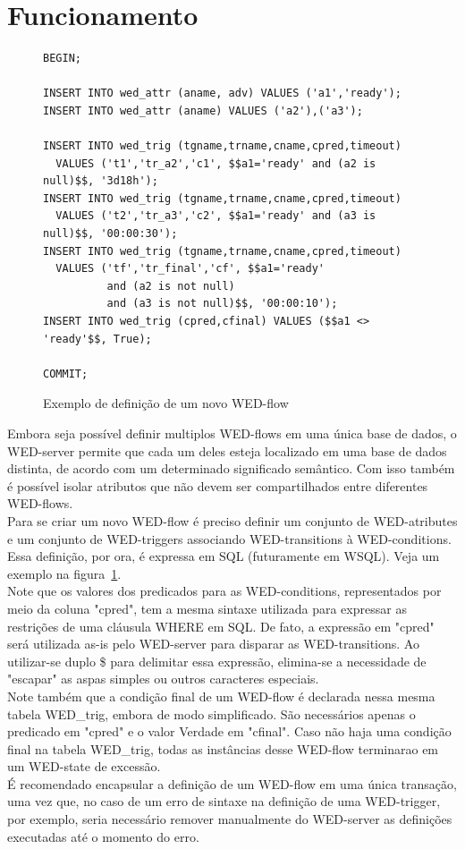 \documentclass[conference]{IEEEtran}
\begin{document}
\section{Funcionamento}
\begin{figure}[!t]
\begin{Verbatim}[fontsize=\tiny]
BEGIN;

INSERT INTO wed_attr (aname, adv) VALUES ('a1','ready');
INSERT INTO wed_attr (aname) VALUES ('a2'),('a3');

INSERT INTO wed_trig (tgname,trname,cname,cpred,timeout) 
  VALUES ('t1','tr_a2','c1', $$a1='ready' and (a2 is null)$$, '3d18h');
INSERT INTO wed_trig (tgname,trname,cname,cpred,timeout) 
  VALUES ('t2','tr_a3','c2', $$a1='ready' and (a3 is null)$$, '00:00:30');
INSERT INTO wed_trig (tgname,trname,cname,cpred,timeout) 
  VALUES ('tf','tr_final','cf', $$a1='ready' 
          and (a2 is not null) 
          and (a3 is not null)$$, '00:00:10');
INSERT INTO wed_trig (cpred,cfinal) VALUES ($$a1 <> 'ready'$$, True);

COMMIT;
\end{Verbatim}
\caption{Exemplo de definição de um novo WED-flow}
\label{fig_wf}
\end{figure}
 Embora seja possível definir multiplos WED-flows em uma única base de dados, o WED-server permite que cada um deles 
esteja localizado em uma base de dados distinta, de acordo com um determinado significado semântico. Com isso também é 
possível isolar atributos que não devem ser compartilhados entre diferentes WED-flows. 
\\
\indent Para se criar um novo WED-flow é preciso definir um conjunto de WED-atributes e um conjunto de WED-triggers associando
WED-transitions à WED-conditions. Essa definição, por ora, é expressa em SQL (futuramente em WSQL). Veja um exemplo na
figura~\ref{fig_wf}.
\\
\indent Note que os valores dos predicados para as WED-conditions, representados por meio da coluna "cpred", tem a mesma sintaxe
utilizada para expressar as restrições de uma cláusula WHERE em SQL. De fato, a expressão em "cpred" será utilizada as-is
pelo WED-server para disparar as WED-transitions. Ao utilizar-se duplo \$ para delimitar essa expressão, elimina-se a necessidade
de "escapar" as aspas simples ou outros caracteres especiais.
\\
\indent  Note também que a condição final de um WED-flow é declarada nessa mesma tabela WED\_trig, embora de modo simplificado.
São necessários apenas o predicado em "cpred" e o valor Verdade em "cfinal". Caso não haja uma condição final na tabela
WED\_trig, todas as instâncias desse WED-flow terminarao em um WED-state de excessão.
\\
\indent É recomendado encapsular a definição de um WED-flow em uma única transação, uma vez que, no caso de um erro de sintaxe
na definição de uma WED-trigger, por exemplo, seria necessário remover manualmente do WED-server as definições executadas
até o momento do erro.
\end{document}
